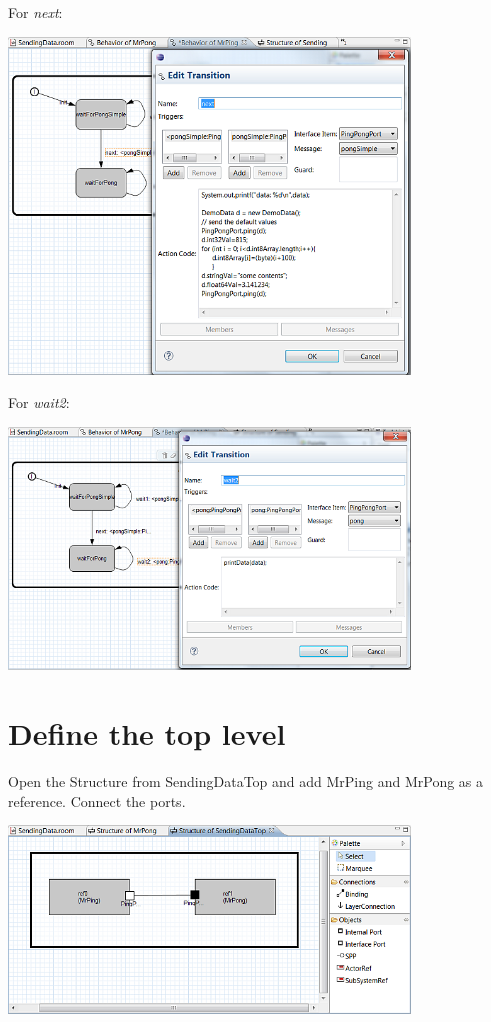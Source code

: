 For \textit{next}:

\includegraphics[width=0.8\textwidth]{images/025-SendingData11.png}

For \textit{wait2}:

\includegraphics[width=0.8\textwidth]{images/025-SendingData12.png}

\section{Define the top level}

Open the Structure from SendingDataTop and add MrPing and MrPong as a reference. Connect the ports.

\includegraphics[width=0.8\textwidth]{images/025-SendingData13.png}

